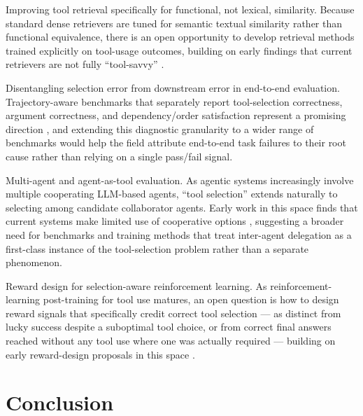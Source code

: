 \documentclass[acmsmall]{acmart}
\begin{document}
Improving tool retrieval specifically for functional, not lexical, similarity. Because standard dense retrievers are tuned for semantic textual similarity rather than functional equivalence, there is an open opportunity to develop retrieval methods trained explicitly on tool-usage outcomes, building on early findings that current retrievers are not fully ``tool-savvy'' \citep{shi2025toolretrieval}.

Disentangling selection error from downstream error in end-to-end evaluation. Trajectory-aware benchmarks that separately report tool-selection correctness, argument correctness, and dependency/order satisfaction represent a promising direction \citep{he2025trajectbench,shen2023taskbench}, and extending this diagnostic granularity to a wider range of benchmarks would help the field attribute end-to-end task failures to their root cause rather than relying on a single pass/fail signal.

Multi-agent and agent-as-tool evaluation. As agentic systems increasingly involve multiple cooperating LLM-based agents, ``tool selection'' extends naturally to selecting among candidate collaborator agents. Early work in this space finds that current systems make limited use of cooperative options \citep{zhang2025toolroco}, suggesting a broader need for benchmarks and training methods that treat inter-agent delegation as a first-class instance of the tool-selection problem rather than a separate phenomenon.

Reward design for selection-aware reinforcement learning. As reinforcement-learning post-training for tool use matures, an open question is how to design reward signals that specifically credit correct tool selection --- as distinct from lucky success despite a suboptimal tool choice, or from correct final answers reached without any tool use where one was actually required --- building on early reward-design proposals in this space \citep{qian2025toolrl}.

\section{Conclusion}
\label{sec:conclusion}
\end{document}
